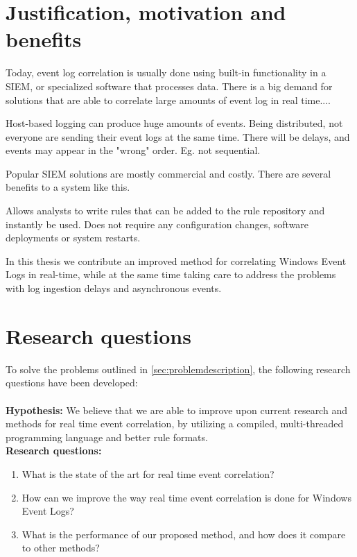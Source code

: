 \section{Justification, motivation and benefits}
\label{sec:motivation}
Today, event log correlation is usually done using built-in functionality in a SIEM, or specialized software that processes data.
There is a big demand for solutions that are able to correlate large amounts of event log in real time....

Host-based logging can produce huge amounts of events.
Being distributed, not everyone are sending their event logs at the same time. There will be delays, and events may appear in the "wrong" order. Eg. not sequential.

Popular SIEM solutions are mostly commercial and costly.
There are several benefits to a system like this.

Allows analysts to write rules that can be added to the rule repository and instantly be used. Does not require any configuration changes, software deployments or system restarts.

In this thesis we contribute an improved method for correlating Windows Event Logs in real-time, while at the same time taking care to address the problems with log ingestion delays and asynchronous events.

\section{Research questions}
\label{sec:researchquestions}
To solve the problems outlined in \ref{sec:problemdescription}, the following research questions have been developed:\\\\
\textbf{Hypothesis:} We believe that we are able to improve upon current research and methods for real time event correlation, by utilizing a compiled, multi-threaded programming language and better rule formats.\\
\textbf{Research questions:}
\begin{enumerate}
    \item What is the state of the art for real time event correlation?
    \item How can we improve the way real time event correlation is done for Windows Event Logs? %
    \item What is the performance of our proposed method, and how does it compare to other methods?
\end{enumerate}


